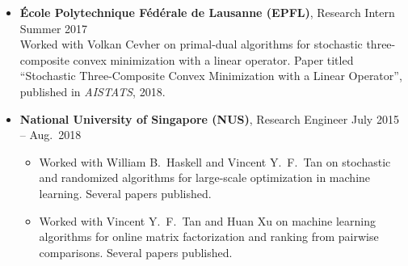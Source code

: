 \documentclass[11pt]{article}
\newcommand{\AISTATS}{Int.\ Conf.\ Artif.\ Intell.\ Stat.\ (AISTATS)}
\begin{document}
\begin{itemize}
\item  {\bf \'Ecole Polytechnique F\'ed\'erale de Lausanne (EPFL)}, {Research Intern} \hfill Summer 2017\\[1ex]
Worked with Volkan Cevher on primal-dual algorithms for stochastic three-composite convex minimization with a linear operator. Paper titled ``Stochastic Three-Composite Convex Minimization with a Linear Operator'', published in {\em AISTATS}, 2018. %

\item {\bf National University of Singapore (NUS)}, {Research Engineer} \hfill July 2015 -- Aug.\ 2018
\begin{itemize}
\item Worked with William B.\ Haskell and Vincent Y.\ F.\ Tan on stochastic and randomized algorithms for large-scale optimization in machine learning. Several papers published. 
\item Worked with Vincent Y.\ F.\ Tan and Huan Xu on machine learning algorithms for online matrix factorization  and ranking from pairwise comparisons. Several papers published.  %
\end{itemize}

\end{itemize}







\end{document}
